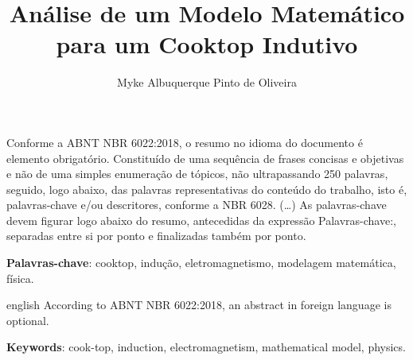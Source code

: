 \documentclass[
	article,			%
	11pt,				%
	oneside,			%
	a4paper,			%
	english,			%
	brazil,				%
	sumario=tradicional
	]{abntex2}
\title{\Huge{Análise de um Modelo Matemático para um Cooktop Indutivo}}
\author{Myke Albuquerque Pinto de Oliveira}
\begin{document}

\frenchspacing 


%
%

\maketitle





\begin{resumoumacoluna}
 Conforme a ABNT NBR 6022:2018, o resumo no idioma do documento é elemento obrigatório. 
 Constituído de uma sequência de frases concisas e objetivas e não de uma 
 simples enumeração de tópicos, não ultrapassando 250 palavras, seguido, logo 
 abaixo, das palavras representativas do conteúdo do trabalho, isto é, 
 palavras-chave e/ou descritores, conforme a NBR 6028. (\ldots) As 
 palavras-chave devem figurar logo abaixo do resumo, antecedidas da expressão 
 Palavras-chave:, separadas entre si por ponto e finalizadas também por ponto.
 
 \vspace{\onelineskip}
 
 \noindent
 \textbf{Palavras-chave}: cooktop, indução, eletromagnetismo, modelagem matemática, física.
\end{resumoumacoluna}


\renewcommand{\resumoname}{Abstract}
\begin{resumoumacoluna}
 \begin{otherlanguage*}{english}
   According to ABNT NBR 6022:2018, an abstract in foreign language is optional.

   \vspace{\onelineskip}
 
   \noindent
   \textbf{Keywords}: cook-top, induction, electromagnetism, mathematical model, physics.
 \end{otherlanguage*}  
\end{resumoumacoluna}
\end{document}
